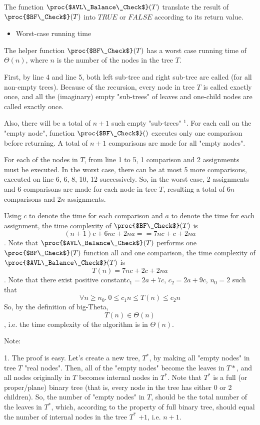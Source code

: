 \documentclass[11pt, answers]{exam}
\theoremstyle{plain}
\theoremstyle{definition}
\begin{document}
\begin{questions}
\begin{solution}
The function $\proc{$AVL\_Balance\_Check$}(T)$ translate the result of $\proc{$BF\_Check$}(T)$ into $TRUE$ or $FALSE$ according to its return value.
\begin{itemize}
\item Worst-case running time
\end{itemize}
The helper function $\proc{$BF\_Check$}(T)$ has a worst case running time of $\Theta(n)$, where $n$ is the number of the nodes in the tree $T$.

First, by line 4 and line 5, both left sub-tree and right sub-tree are called (for all non-empty trees). Because of the recursion, every node in tree $T$ is called exactly once, and all the (imaginary) empty "sub-trees" of leaves and one-child nodes are called exactly once.

Also, there will be a total of $n+1$ such empty "sub-trees" $^1$. For each call on the "empty node", function $\proc{$BF\_Check$}()$ executes only one comparison before returning. A total of $n+1$ comparisons are made for all "empty nodes".

For each of the nodes in $T$, from line 1 to 5, 1 comparison and 2 assignments must be executed. In the worst case, there can be at most 5 more comparisons, executed on line 6, 6, 8, 10, 12 successively. So, in the worst case, 2 assignments and 6 comparisons are made for each node in tree $T$, resulting a total of $6n$ comparisons and $2n$ assignments.

Using $c$ to denote the time for each comparison and $a$ to denote the time for each assignment, the time complexity of $\proc{$BF\_Check$}(T)$ is $$(n+1)c+6nc+2na == 7nc+c+2na$$. Note that $\proc{$AVL\_Balance\_Check$}(T)$ performs one $\proc{$BF\_Check$}(T)$ function all and one comparison, the time complexity of $\proc{$AVL\_Balance\_Check$}(T)$ is $$T(n) = 7nc+2c+2na$$.
Note that there exist positive constant$c_1=2a+7c$, $c_2=2a+9c$, $n_0=2$ such that $$\forall n\geq n_0 .\  0\leq c_1n \leq T(n) \leq c_2n$$
So, by the definition of big-Theta, $$T(n) \in \Theta(n)$$, i.e. the time complexity of the algorithm is in $\Theta(n)$.

Note:

1. The proof is easy. Let's create a new tree, $T^*$, by making all "empty nodes" in tree $T$ "real nodes". Then, all of the "empty nodes" become the leaves in $T*$, and all nodes originally in $T$ becomes internal nodes in $T^*$. Note that $T^*$ is a full (or proper/plane) binary tree (that is, every node in the tree has either 0 or 2 children). So, the number of "empty nodes" in $T$, should be the total number of the leaves in $T^*$, which, according to the property of full binary tree, should equal the number of internal nodes in the tree $T^*$ $+1$, i.e. $n+1$.
\end{solution}


\end{questions}
\end{document}
